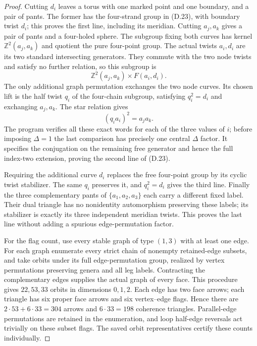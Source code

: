 \begin{proof}
Cutting $d_i$ leaves a torus with one marked point and one
boundary, and a pair of pants.  The former has the
four-strand group in (D.23), with boundary twist $d_i$;
this proves the first line, including its meridian.
Cutting $a_j,a_k$ gives a pair of pants and a four-holed
sphere.  The subgroup fixing both curves has kernel
$\mathbb Z^2(a_j,a_k)$ and quotient the pure four-point
group.  The actual twists $a_i,d_i$ are its two standard
intersecting generators.  They commute with the two node
twists and satisfy no further relation, so this subgroup is
\[
             \mathbb Z^2(a_j,a_k)\times F(a_i,d_i).
\]
The only additional graph permutation exchanges the two
node curves.  Its chosen lift is the half twist $q_i$ of
the four-chain subgroup, satisfying $q_i^2=d_i$ and
exchanging $a_j,a_k$.  The star relation gives
\[
                         (q_i a_i)^2=a_ja_k.
\]
The program verifies all these exact words for each of the
three values of $i$; before imposing $\Delta=1$ the last
comparison has precisely one central $\Delta$ factor.
It specifies the conjugation on the remaining free
generator and hence the full index-two extension, proving
the second line of (D.23).

Requiring the additional curve $d_i$ replaces the free
four-point group by its cyclic twist stabilizer.  The
same $q_i$ preserves it, and $q_i^2=d_i$ gives the third
line.  Finally the three complementary pants of
$\{a_1,a_2,a_3\}$ each carry a different fixed label.
Their dual triangle has no nonidentity automorphism
preserving these labels; its stabilizer is exactly its
three independent meridian twists.  This proves the last
line without adding a spurious edge-permutation factor.

For the flag count, use every stable graph of type $(1,3)$
with at least one edge.  For each graph enumerate every
strict chain of nonempty retained-edge subsets, and take
orbits under its full edge-permutation group, realized
by vertex permutations preserving genera and all leg
labels.  Contracting the complementary edges supplies
the actual graph of every face.  This procedure gives
$22,53,33$ orbits in dimensions $0,1,2$.
Each edge has two face arrows; each triangle has six
proper face arrows and six vertex--edge flags.  Hence
there are $2\cdot53+6\cdot33=304$ arrows and
$6\cdot33=198$ coherence triangles.  Parallel-edge
permutations are retained in the enumeration, and
loop half-edge reversals act trivially on these subset
flags.  The saved orbit representatives certify these
counts individually.
\end{proof}
